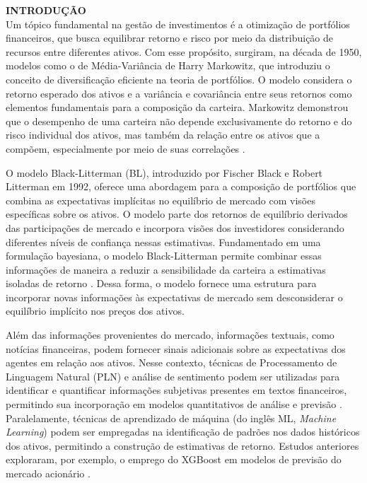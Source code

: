 \noindent\textbf{INTRODUÇÃO}
$\!$\\

Um tópico fundamental na gestão de investimentos é a otimização de portfólios financeiros, que busca equilibrar retorno e risco por meio da distribuição de recursos entre diferentes ativos. Com esse propósito, surgiram, na década de 1950, modelos como o de Média-Variância de Harry Markowitz, que introduziu o conceito de diversificação eficiente na teoria de portfólios. O modelo considera o retorno esperado dos ativos e a variância e covariância entre seus retornos como elementos fundamentais para a composição da carteira. Markowitz demonstrou que o desempenho de uma carteira não depende exclusivamente do retorno e do risco individual dos ativos, mas também da relação entre os ativos que a compõem, especialmente por meio de suas correlações \cite{markowitz}.

O modelo Black-Litterman (BL), introduzido por Fischer Black e Robert Litterman em 1992, oferece uma abordagem para a composição de portfólios que combina as expectativas implícitas no equilíbrio de mercado com visões específicas sobre os ativos. O modelo parte dos retornos de equilíbrio derivados das participações de mercado e incorpora visões dos investidores considerando diferentes níveis de confiança nessas estimativas. Fundamentado em uma formulação bayesiana, o modelo Black-Litterman permite combinar essas informações de maneira a reduzir a sensibilidade da carteira a estimativas isoladas de retorno \cite{blacklitterman}. Dessa forma, o modelo fornece uma estrutura para incorporar novas informações às expectativas de mercado sem desconsiderar o equilíbrio implícito nos preços dos ativos.

Além das informações provenientes do mercado, informações textuais, como notícias financeiras, podem fornecer sinais adicionais sobre as expectativas dos agentes em relação aos ativos. Nesse contexto, técnicas de Processamento de Linguagem Natural (PLN) e análise de sentimento podem ser utilizadas para identificar e quantificar informações subjetivas presentes em textos financeiros, permitindo sua incorporação em modelos quantitativos de análise e previsão \cite{du2024financial}. Paralelamente, técnicas de aprendizado de máquina (do inglês ML, \textit{Machine Learning}) podem ser empregadas na identificação de padrões nos dados históricos dos ativos, permitindo a construção de estimativas de retorno. Estudos anteriores exploraram, por exemplo, o emprego do XGBoost em modelos de previsão do mercado acionário \cite{shi2022attclx}.

